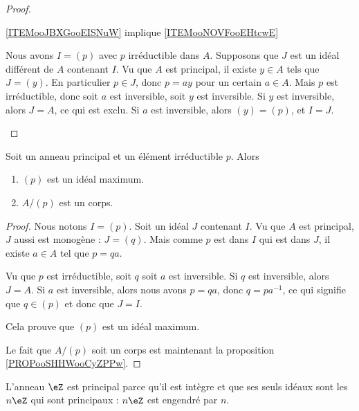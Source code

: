 \begin{proof}
\begin{subproof}
        \item[\ref{ITEMooJBXGooEISNuW} implique \ref{ITEMooNOVFooEHtcwE}]

            Nous avons \( I=(p)\) avec \( p\) irréductible dans \( A\). Supposons que \( J\) est un idéal différent de \( A\) contenant \( I\). Vu que \( A\) est principal, il existe \( y\in A\) tels que \( J=(y)\). En particulier \( p\in J\), donc \( p=ay\) pour un certain \( a\in A\). Mais \( p\) est irréductible, donc soit \( a\) est inversible, soit \( y\) est inversible. Si \( y\) est inversible, alors \( J=A\), ce qui est exclu. Si \( a\) est inversible, alors \( (y)=(p)\), et \( I=J\).

    \end{subproof}
\end{proof}

\begin{proposition}     \label{PropoTMMXCx}
    Soit un anneau principal et un élément irréductible \( p\). Alors
    \begin{enumerate}
        \item
            \( (p)\) est un idéal maximum.
        \item       \label{ITEMooKPJQooWuPZXS}
            \( A/(p)\) est un corps.
    \end{enumerate}
\end{proposition}

\begin{proof}
    Nous notons \( I=(p)\). Soit un idéal \( J\) contenant \( I\). Vu que \( A\) est principal, \( J\) aussi est monogène : \( J=(q)\). Mais comme \( p\) est dans \( I\) qui est dans \( J\), il existe \( a\in A\) tel que \( p=qa\).

    Vu que \( p\) est irréductible, soit \( q\) soit \( a\) est inversible. Si \( q\) est inversible, alors \( J=A\). Si \( a\) est inversible, alors nous avons \( p=qa\), donc \( q=pa^{-1}\), ce qui signifie que \( q\in(p)\) et donc que \( J=I\).

    Cela prouve que \( (p)\) est un idéal maximum.

    Le fait que \( A/(p)\) soit un corps est maintenant la proposition \ref{PROPooSHHWooCyZPPw}.
\end{proof}

\begin{example}
    L'anneau \( \eZ\) est principal parce qu'il est intègre et que ses seuls idéaux sont les \( n\eZ\) qui sont principaux : \( n\eZ\) est engendré par \( n\).
\end{example}

